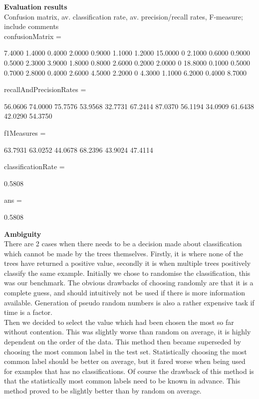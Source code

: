 \documentclass[12pt]{article}
\begin{document}
{\bf Evaluation results} \\
Confusion matrix, av. classification rate, av. precision/recall rates, F-measure; include comments \\

          confusionMatrix =

          7.4000    1.4000    0.4000    2.0000    0.9000    1.1000
          1.2000   15.0000         0    2.1000    0.6000    0.9000
          0.5000    2.3000    3.9000    1.8000    0.8000    2.6000
          0.2000    2.0000         0   18.8000    0.1000    0.5000
          0.7000    2.8000    0.4000    2.6000    4.5000    2.2000
          0    4.3000    1.1000    6.2000    0.4000    8.7000


          recallAndPrecisionRates =

          56.0606   74.0000
          75.7576   53.9568
          32.7731   67.2414
          87.0370   56.1194
          34.0909   61.6438
          42.0290   54.3750


          f1Measures =

          63.7931
          63.0252
          44.0678
          68.2396
          43.9024
          47.4114


          classificationRate =

          0.5808


          ans =

          0.5808

{\bf Ambiguity} \\
There are 2 cases when there needs to be a decision made about classification which cannot be made by the trees themselves. Firstly, it is where none of the trees have returned a positive value, secondly it is when multiple trees positively classify the same example. Initially we chose to randomise the classification, this was our benchmark. The obvious drawbacks of choosing randomly are that it is a complete guess, and should intuitively not be used if there is more information available. Generation of pseudo random numbers is also a rather expensive task if time is a factor. \\

Then we decided to select the value which had been chosen the most so far without contention. This was slightly worse than random on average, it is highly dependent on the order of the data. This method then became superseded by choosing the most common label in the test set. Statistically choosing the most common label should be better on average, but it fared worse when being used for examples that has no classifications. Of course the drawback of this method is that the statistically most common labels need to be known in advance. This method proved to be slightly better than by random on average. \\
\end{document}
